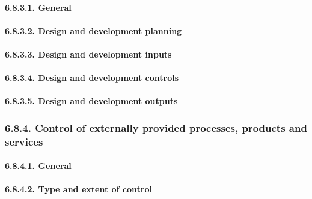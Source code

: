 \documentclass[
]{article}
\begin{document}
\hypertarget{general-13}{%
\paragraph{6.8.3.1. General}\label{general-13}}

\hypertarget{design-and-development-planning-1}{%
\paragraph{6.8.3.2. Design and development
planning}\label{design-and-development-planning-1}}

\hypertarget{design-and-development-inputs-1}{%
\paragraph{6.8.3.3. Design and development
inputs}\label{design-and-development-inputs-1}}

\hypertarget{design-and-development-controls-1}{%
\paragraph{6.8.3.4. Design and development
controls}\label{design-and-development-controls-1}}

\hypertarget{design-and-development-outputs-1}{%
\paragraph{6.8.3.5. Design and development
outputs}\label{design-and-development-outputs-1}}

\hypertarget{control-of-externally-provided-processes-products-and-services-1}{%
\subsubsection{6.8.4. Control of externally provided processes, products
and
services}\label{control-of-externally-provided-processes-products-and-services-1}}

\hypertarget{general-14}{%
\paragraph{6.8.4.1. General}\label{general-14}}

\hypertarget{type-and-extent-of-control-1}{%
\paragraph{6.8.4.2. Type and extent of
control}\label{type-and-extent-of-control-1}}
\end{document}
